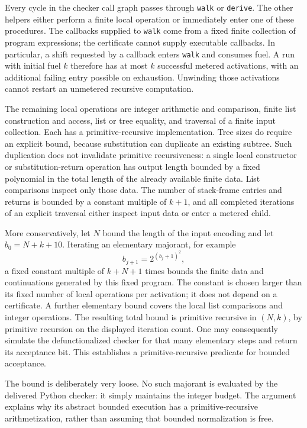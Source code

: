 \documentclass[11pt,a4paper]{article}
\theoremstyle{definition}\newtheorem{definition}[theorem]{Definition}
\theoremstyle{remark}\newtheorem{remark}[theorem]{Remark}
\begin{document}
Every cycle in the checker call graph passes through \texttt{walk} or
\texttt{derive}. The other helpers either perform a finite local operation
or immediately enter one of these procedures. The callbacks supplied to
\texttt{walk} come from a fixed finite collection of program expressions;
the certificate cannot supply executable callbacks. In particular, a shift
requested by a callback enters \texttt{walk} and consumes fuel. A run with
initial fuel $k$ therefore has at most $k$ successful metered activations,
with an additional failing entry possible on exhaustion. Unwinding those
activations cannot restart an unmetered recursive computation.

The remaining local operations are integer arithmetic and comparison,
finite list construction and access, list or tree equality, and traversal
of a finite input collection. Each has a primitive-recursive implementation.
Tree sizes do require an explicit bound, because substitution can duplicate
an existing subtree. Such duplication does not invalidate primitive
recursiveness: a single local constructor or substitution-return operation
has output length bounded by a fixed polynomial in the total length of the
already available finite data. List comparisons inspect only those data.
The number of stack-frame entries and returns is bounded by a constant
multiple of $k+1$, and all completed iterations of an explicit traversal
either inspect input data or enter a metered child.

More conservatively, let $N$ bound the length of the input encoding and let
$b_0=N+k+10$. Iterating an elementary majorant, for example
\[
             b_{j+1}=2^{(b_j+1)^2},
\]
a fixed constant multiple of $k+N+1$ times bounds the finite data and
continuations generated by this fixed program. The constant is chosen
larger than its fixed number of local operations per activation; it does
not depend on a certificate. A further elementary bound covers the local
list comparisons and integer operations. The resulting total bound is
primitive recursive in $(N,k)$, by primitive recursion on the displayed
iteration count. One may consequently simulate the defunctionalized
checker for that many elementary steps and return its acceptance bit.
This establishes a primitive-recursive predicate for bounded acceptance.

The bound is deliberately very loose. No such majorant is evaluated by the
delivered Python checker: it simply maintains the integer budget. The
argument explains why its abstract bounded execution has a
primitive-recursive arithmetization, rather than assuming that bounded
normalization is free.
\end{document}
